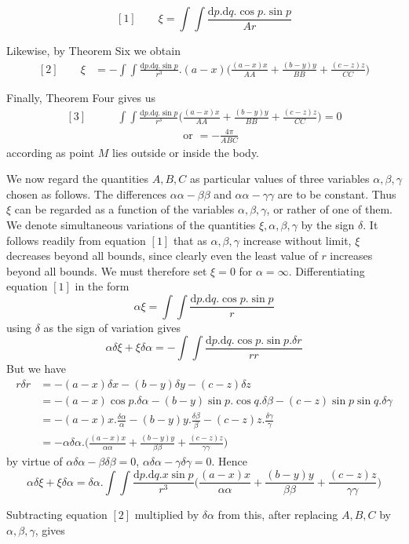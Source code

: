 \[
[1]\qquad \xi=\int\!\int\frac{\mathrm{d}p.\mathrm{d}q.\cos p.\sin p}{Ar}
\]
\par
Likewise, by Theorem Six we obtain
\[
\begin{aligned}
[2]\qquad \xi&=-\int\!\int\frac{\mathrm{d}p.\mathrm{d}q.\sin p}{r^3}.(a-x)\bigl(\frac{(a-x)x}{AA}+\frac{(b-y)y}{BB}+\frac{(c-z)z}{CC}\bigr)
\end{aligned}
\]
\par
Finally, Theorem Four gives us
\[
\begin{aligned}
[3]\qquad &\int\!\int\frac{\mathrm{d}p.\mathrm{d}q.\sin p}{r^3}\bigl(\frac{(a-x)x}{AA}+\frac{(b-y)y}{BB}+\frac{(c-z)z}{CC}\bigr)=0\\
&\hspace{6em}\text{or }=-\frac{4\pi}{ABC}
\end{aligned}
\]
according as point $M$ lies outside or inside the body.

We now regard the quantities $A,B,C$ as particular values of three variables $\alpha,\beta,\gamma$ chosen as follows. The differences $\alpha\alpha-\beta\beta$ and $\alpha\alpha-\gamma\gamma$ are to be constant. Thus $\xi$ can be regarded as a function of the variables $\alpha,\beta,\gamma$, or rather of one of them. We denote simultaneous variations of the quantities $\xi,\alpha,\beta,\gamma$ by the sign $\delta$. It follows readily from equation $[1]$ that as $\alpha,\beta,\gamma$ increase without limit, $\xi$ decreases beyond all bounds, since clearly even the least value of $r$ increases beyond all bounds. We must therefore set $\xi=0$ for $\alpha=\infty$. Differentiating equation $[1]$ in the form
\[
\alpha\xi=\int\!\int\frac{\mathrm{d}p.\mathrm{d}q.\cos p.\sin p}{r}
\]
using $\delta$ as the sign of variation gives
\[
\alpha\delta\xi+\xi\delta\alpha=-\int\!\int\frac{\mathrm{d}p.\mathrm{d}q.\cos p.\sin p.\delta r}{rr}
\]
But we have
\[
\begin{aligned}
r\delta r&=-(a-x)\delta x-(b-y)\delta y-(c-z)\delta z\\
&=-(a-x)\cos p.\delta\alpha-(b-y)\sin p.\cos q.\delta\beta-(c-z)\sin p\sin q.\delta\gamma\\
&=-(a-x)x.\frac{\delta\alpha}{\alpha}-(b-y)y.\frac{\delta\beta}{\beta}-(c-z)z.\frac{\delta\gamma}{\gamma}\\
&=-\alpha\delta\alpha.\bigl(\frac{(a-x)x}{\alpha\alpha}+\frac{(b-y)y}{\beta\beta}+\frac{(c-z)z}{\gamma\gamma}\bigr)
\end{aligned}
\]
by virtue of $\alpha\delta\alpha-\beta\delta\beta=0$, $\alpha\delta\alpha-\gamma\delta\gamma=0$. Hence
\[
\alpha\delta\xi+\xi\delta\alpha=\delta\alpha.\int\!\int\frac{\mathrm{d}p.\mathrm{d}q.x\sin p}{r^3}\bigl(\frac{(a-x)x}{\alpha\alpha}+\frac{(b-y)y}{\beta\beta}+\frac{(c-z)z}{\gamma\gamma}\bigr)
\]
\par
Subtracting equation $[2]$ multiplied by $\delta\alpha$ from this, after replacing $A,B,C$ by $\alpha,\beta,\gamma$, gives
